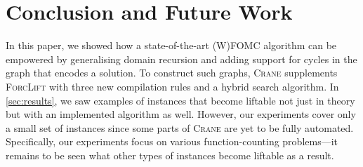 \documentclass[letterpaper]{article} %
\theoremstyle{definition}
\theoremstyle{remark}
\begin{document}
\section{Conclusion and Future Work}


In this paper, we showed how a state-of-the-art (W)FOMC algorithm can be
empowered by generalising domain recursion and adding support for cycles in the
graph that encodes a solution. To construct such graphs, \textsc{Crane}
supplements \textsc{ForcLift} \citep{DBLP:conf/ijcai/BroeckTMDR11} with three
new compilation rules and a hybrid search algorithm. In \cref{sec:results}, we
saw examples of instances that become liftable not just in theory
\citep{DBLP:journals/jair/Kuzelka21} but with an implemented algorithm as well.
However, our experiments cover only a small set of instances since some parts of
\textsc{Crane} are yet to be fully automated. Specifically, our experiments
focus on various function-counting problems---it remains to be seen what other
types of instances become liftable as a result.

\end{document}
